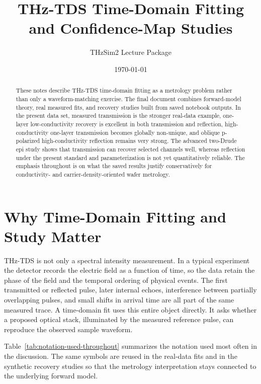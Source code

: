 \documentclass[11pt]{article}
\title{THz-TDS Time-Domain Fitting and Confidence-Map Studies}
\author{THzSim2 Lecture Package}
\date{\today}
\begin{document}
\maketitle

\begin{abstract}
These notes describe THz-TDS time-domain fitting as a metrology problem rather than only a waveform-matching exercise. The final document combines forward-model theory, real measured fits, and recovery studies built from saved notebook outputs. In the present data set, measured transmission is the stronger real-data example, one-layer low-conductivity recovery is excellent in both transmission and reflection, high-conductivity one-layer transmission becomes globally non-unique, and oblique p-polarized high-conductivity reflection remains very strong. The advanced two-Drude epi study shows that transmission can recover selected channels well, whereas reflection under the present standard and parameterization is not yet quantitatively reliable. The emphasis throughout is on what the saved results justify conservatively for conductivity- and carrier-density-oriented wafer metrology.
\end{abstract}

\tableofcontents
\clearpage

\section{Why Time-Domain Fitting and Study Matter}

THz-TDS is not only a spectral intensity measurement. In a typical experiment the detector records the electric field as a function of time, so the data retain the phase of the field and the temporal ordering of physical events. The first transmitted or reflected pulse, later internal echoes, interference between partially overlapping pulses, and small shifts in arrival time are all part of the same measured trace. A time-domain fit uses this entire object directly. It asks whether a proposed optical stack, illuminated by the measured reference pulse, can reproduce the observed sample waveform.

Table~\ref{tab:notation-used-throughout} summarizes the notation used most often in the discussion. The same symbols are reused in the real-data fits and in the synthetic recovery studies so that the metrology interpretation stays connected to the underlying forward model.
\end{document}

